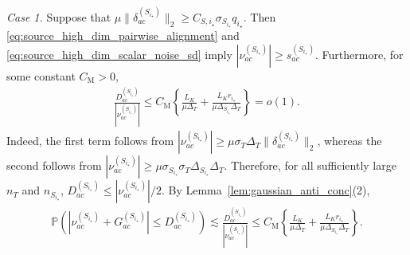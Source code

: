 \documentclass[10pt]{article}
\newcommand{\trg}{T}
\newcommand{\nT}{n_{\trg}}
\newcommand{\sigmaT}{\sigma_{\trg}}
\newcommand{\DeltaT}{\Delta_{\trg}}
\newcommand{\src}{S}
\newcommand{\nSm}[1]{n_{\src_{#1}}}
\newcommand{\sigmaSm}[1]{\sigma_{\src_{#1}}}
\newcommand{\DeltaSm}[1]{\Delta_{\src_{#1}}}
\begin{document}
\medskip
\noindent
\emph{Case 1.} Suppose that $\mu\|\delta_{ac}^{(\src_{i_\star})}\|_2\ge C_{\src,i_\star}\sigmaSm{i_\star}q_{i_\star}$. Then \eqref{eq:source_high_dim_pairwise_alignment} and \eqref{eq:source_high_dim_scalar_noise_sd} imply $|\nu_{ac}^{(\src_{i_\star})}|\ge s_{ac}^{(\src_{i_\star})}$. Furthermore, for some constant $C_{\mathrm M}>0$,
\begin{align}
\label{eq:source_high_dim_mean_dominant_radius_ratio}
    \frac{D_{ac}^{(\src_{i_\star})}}{|\nu_{ac}^{(\src_{i_\star})}|}\le C_{\mathrm M}\left\{\frac{L_K}{\mu\DeltaT}+\frac{L_Kr_{i_\star}}{\mu\DeltaSm{i_\star}\DeltaT}\right\}=o(1).
\end{align}
Indeed, the first term follows from $|\nu_{ac}^{(\src_{i_\star})}|\ge \mu\sigmaT\DeltaT\|\delta_{ac}^{(\src_{i_\star})}\|_2$, whereas the second follows from $|\nu_{ac}^{(\src_{i_\star})}|\ge \mu\sigmaSm{i_\star}\sigmaT\DeltaSm{i_\star}\DeltaT$. Therefore, for all sufficiently large $\nT$ and $\nSm{i_\star}$, $D_{ac}^{(\src_{i_\star})}\le |\nu_{ac}^{(\src_{i_\star})}|/2$. By Lemma~\ref{lem:gaussian_anti_conc}(2),
\begin{align}
\label{eq:source_high_dim_mean_dominant_small_ball}
    \mathbb P\left(|\nu_{ac}^{(\src_{i_\star})}+G_{ac}^{(\src_{i_\star})}|\le D_{ac}^{(\src_{i_\star})}\right)\lesssim \frac{D_{ac}^{(\src_{i_\star})}}{|\nu_{ac}^{(\src_{i_\star})}|}\le C_{\mathrm M}\left\{\frac{L_K}{\mu\DeltaT}+\frac{L_Kr_{i_\star}}{\mu\DeltaSm{i_\star}\DeltaT}\right\}.
\end{align}
\end{document}
